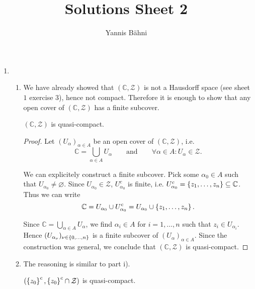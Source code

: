 

\title{Solutions Sheet 2}
\author{Yannis B\"{a}hni}
\address[Yannis B\"{a}hni]{University of Zurich, R\"{a}mistrasse 71, 8006 Zurich}


\maketitle
\thispagestyle{fancy}
\begin{enumerate}[label = \textbf{Exercise \arabic*.},wide = 0pt, itemsep=1.5ex]
	\item 
		~
		\begin{enumerate}[label = (\roman*),wide = 10pt, itemsep=1.5ex]
			\item We have already showed that $(\mathbb{C},\mathcal{Z})$ is not a Hausdorff space (see sheet $1$ exercise $3$), hence not compact. Therefore it is enough to show that any open cover of $(\mathbb{C},\mathcal{Z})$ has a finite subcover. 
					\begin{lemma}
						$(\mathbb{C},\mathcal{Z})$ is quasi-compact.
						\label{lem:finitecover}
					\end{lemma}
				
				\begin{proof}
				Let $(U_\alpha)_{\alpha \in A}$ be an open cover of $(\mathbb{C},\mathcal{Z})$, i.e. 
				\begin{equation}
					\mathbb{C} = \bigcup_{\alpha \in A}U_\alpha \qquad \text{and} \qquad \forall \alpha \in A: U_\alpha \in \mathcal{Z}.
				\end{equation}

				We can explicitely construct a finite subcover. Pick some $\alpha_0 \in A$ such that $U_{\alpha_0} \neq \varnothing$. Since $U_{\alpha_0} \in \mathcal{Z}$, $U_{\alpha_0}^c$ is finite, i.e. $U_{\alpha_0}^c = \cbr[0]{z_1,\dots,z_n} \subseteq \mathbb{C}$. Thus we can write 
		\begin{equation}
			\mathbb{C} = U_{\alpha_0} \cup U_{\alpha_0}^c = U_{\alpha_0} \cup \cbr[0]{z_1,\dots,z_n}.
		\end{equation}

		Since $\mathbb{C} = \bigcup_{\alpha \in A}U_\alpha$, we find $\alpha_i \in A$ for $i = 1,\dots,n$ such that $z_i \in U_{\alpha_i}$. Hence $(U_{\alpha_\nu})_{\nu \in \cbr[0]{0,\dots,n}}$ is a finite subcover of $(U_\alpha)_{\alpha \in A}$. Since the construction was general, we conclude that $(\mathbb{C},\mathcal{Z})$ is quasi-compact. 
	\end{proof}
\item The reasoning is similar to part i).
		\begin{lemma}
			$(\cbr[0]{z_0}^c, \cbr[0]{z_0}^c \cap \mathcal{Z})$ is quasi-compact.
			\label{lem:z_0_quasi}
		\end{lemma}


\end{enumerate}
\end{enumerate}
